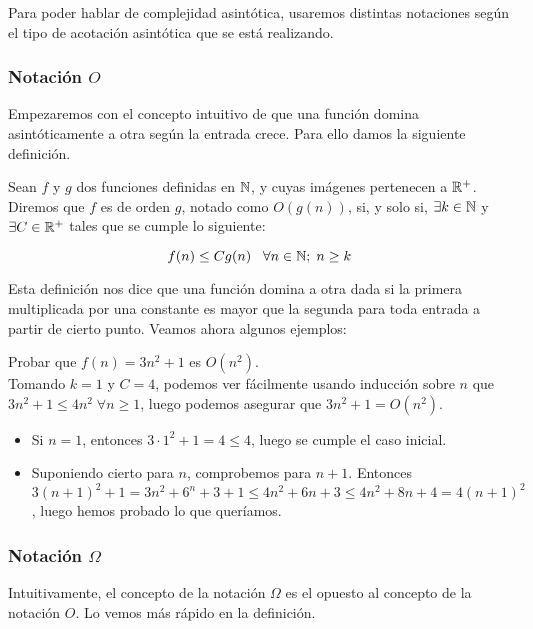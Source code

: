 Para poder hablar de complejidad asintótica, usaremos distintas notaciones según el tipo de acotación asintótica que se está realizando.

\subsubsection{Notación $O$}

Empezaremos con el concepto intuitivo de que una función domina asintóticamente a otra según la entrada crece. Para ello damos la siguiente definición.

\begin{definicion}
	Sean $f$ y $g$ dos funciones definidas en $\mathbb{N}$, y cuyas imágenes pertenecen a $\mathbb{R}^+$. Diremos que $f$ es de orden $g$, notado como $O(g(n))$, si, y solo si, $\exists k \in \mathbb{N}$ y $\exists C \in \mathbb{R}^+$ tales que se cumple lo siguiente:
	
	$$f(n) \leq Cg(n) \;\;\;\forall n \in \mathbb{N};\; n \geq k$$
\end{definicion}

Esta definición nos dice que una función domina a otra dada si la primera multiplicada por una constante es mayor que la segunda para toda entrada a partir de cierto punto. Veamos ahora algunos ejemplos:

\begin{ejemplo}
	Probar que $f(n) = 3n^2 + 1$ es $O(n^2)$.\\
	
	Tomando $k=1$ y $C=4$, podemos ver fácilmente usando inducción sobre $n$ que $3n^2 + 1 \leq 4n^2\;\forall n \geq 1$, luego podemos asegurar que $3n^2 + 1 = O(n^2)$.\\
	
	\begin{itemize}
		\item Si $n=1$, entonces $3 \cdot 1^2 + 1 = 4 \leq 4$, luego se cumple el caso inicial.
		\item Suponiendo cierto para $n$, comprobemos para $n + 1$. Entonces $3(n+1)^2 + 1 = 3n^2 + 6^n + 3 + 1 \leq 4n^2 + 6n + 3 \leq 4n^2 + 8n + 4 = 4(n+1)^2$, luego hemos probado lo que queríamos.
	\end{itemize}
\end{ejemplo}

\subsubsection{Notación $\Omega$}

Intuitivamente, el concepto de la notación $\Omega$ es el opuesto al concepto de la notación $O$. Lo vemos más rápido en la definición.

